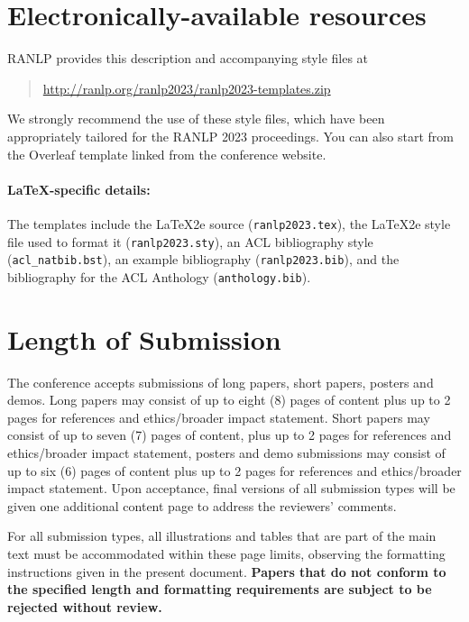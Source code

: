 \documentclass[11pt,a4paper]{article}
\begin{document}
\section{Electronically-available resources}

RANLP provides this description and accompanying style files at
\begin{quote}
\url{http://ranlp.org/ranlp2023/ranlp2023-templates.zip}
\end{quote}
We strongly recommend the use of these style files, which have been appropriately tailored for the RANLP 2023 proceedings. You can also start from the Overleaf template linked from the conference website. 

\paragraph{\LaTeX-specific details:}
The templates include the \LaTeX2e{} source (\texttt{\small ranlp2023.tex}),
the \LaTeX2e{} style file used to format it (\texttt{\small ranlp2023.sty}),
an ACL bibliography style (\texttt{\small acl\_natbib.bst}),
an example bibliography (\texttt{\small ranlp2023.bib}),
and the bibliography for the ACL Anthology (\texttt{\small anthology.bib}).


\section{Length of Submission}
\label{sec:length}

The conference accepts submissions of long papers, short papers, posters and demos. Long papers may consist of up to eight (8) pages of content plus up to 2 pages for references and ethics/broader impact statement. Short papers may consist of up to seven (7) pages of content, plus up to 2 pages for references and ethics/broader impact statement, posters and demo submissions may consist of up to six (6) pages of content plus up to 2 pages for references and ethics/broader impact statement. Upon acceptance, final versions of all submission types will be given one additional content page to address the reviewers' comments.

For all submission types, all illustrations and tables that are part of the main text must be accommodated within these page limits, observing the formatting instructions given in the present document. 
\textbf{Papers that do not conform to the specified length and formatting requirements are subject to be rejected without review.}
\end{document}
